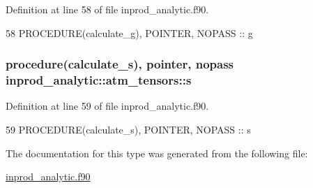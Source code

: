 Definition at line 58 of file inprod\+\_\+analytic.\+f90.


\begin{DoxyCode}
58      \textcolor{keywordtype}{PROCEDURE}(calculate\_g), \textcolor{keywordtype}{POINTER}, \textcolor{keywordtype}{NOPASS} :: g
\end{DoxyCode}
\subsubsection[{\texorpdfstring{s}{s}}]{\setlength{\rightskip}{0pt plus 5cm}procedure({\bf calculate\+\_\+s}), pointer, nopass inprod\+\_\+analytic\+::atm\+\_\+tensors\+::s\hspace{0.3cm}{\ttfamily [private]}}\hypertarget{structinprod__analytic_1_1atm__tensors_a27edca850b0482aea4aac985ec64124d}{}\label{structinprod__analytic_1_1atm__tensors_a27edca850b0482aea4aac985ec64124d}


Definition at line 59 of file inprod\+\_\+analytic.\+f90.


\begin{DoxyCode}
59      \textcolor{keywordtype}{PROCEDURE}(calculate\_s), \textcolor{keywordtype}{POINTER}, \textcolor{keywordtype}{NOPASS} :: s
\end{DoxyCode}


The documentation for this type was generated from the following file\+:\begin{DoxyCompactItemize}
\item 
\hyperlink{inprod__analytic_8f90}{inprod\+\_\+analytic.\+f90}\end{DoxyCompactItemize}
